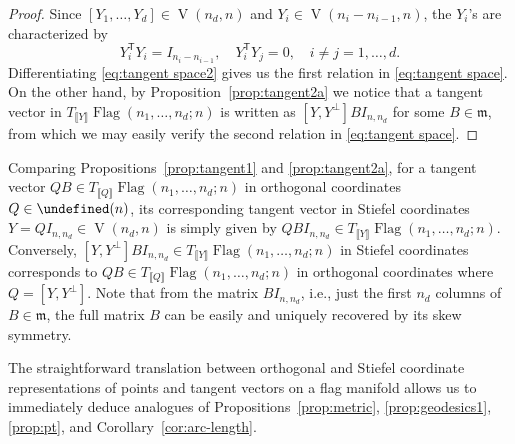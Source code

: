 \documentclass[11pt,reqno]{amsart}%
\theoremstyle{definition}
\theoremstyle{remark}
\newcommand{\tp}{{\scriptscriptstyle\mathsf{T}}}
\newcommand{\lb}{\llbracket}
\newcommand{\rb}{\rrbracket}
\let\O\undefined
\DeclareMathOperator{\V}{V}
\DeclareMathOperator{\Flag}{Flag}
\DeclareMathOperator{\O}{O}
\begin{document}
\begin{proof}
Since $ [Y_1,\dots, Y_d] \in \V(n_d,n)$ and $ Y_i \in \V(n_i - n_{i-1},n)$, the $Y_i$'s are characterized by 
\begin{equation}\label{eq:tangent space2}
Y_i^\tp Y_i = I_{n_i - n_{i-1}},\quad Y_i^\tp Y_j = 0,\quad i\ne  j =1,\dots, d.
\end{equation}
Differentiating \eqref{eq:tangent space2} gives us the first relation in \eqref{eq:tangent space}. On the other hand, by Proposition~\ref{prop:tangent2a} we notice that a tangent vector in $T_{\lb Y \rb}\Flag(n_1,\dots,n_d;n)$ is written as $[Y,Y^\perp] B I_{n,n_d}$ for some $B\in \mathfrak{m}$, from which we may easily verify the second relation in \eqref{eq:tangent space}.
\end{proof}

Comparing Propositions~\ref{prop:tangent1} and \ref{prop:tangent2a}, for a tangent vector $QB \in T_{\lb Q \rb} \Flag(n_1,\dots,n_d;n)$ in orthogonal coordinates $Q \in \O(n)$, its corresponding tangent vector in Stiefel coordinates $Y = Q I_{n,n_d} \in \V(n_d,n)$ is simply given by $QB I_{n,n_d} \in T_{\lb Y \rb} \Flag(n_1,\dots,n_d;n)$. Conversely, $[Y,Y^{\perp}] B I_{n,n_d} \in T_{\lb Y \rb} \Flag(n_1,\dots,n_d;n)$ in Stiefel coordinates corresponds to $QB \in T_{\lb Q \rb} \Flag(n_1,\dots,n_d;n)$ in orthogonal coordinates where $Q = [Y,Y^{\perp}]$. Note that from the matrix $B I_{n,n_d}$, i.e., just the first $n_d$ columns of $B \in \mathfrak{m}$, the full matrix $B$ can be easily and uniquely recovered by its skew symmetry.

The straightforward translation between orthogonal and Stiefel coordinate representations of points and tangent vectors on a flag manifold allows us to immediately deduce analogues of Propositions~\ref{prop:metric}, \ref{prop:geodesics1}, \ref{prop:pt}, and Corollary~\ref{cor:arc-length}.
\end{document}
